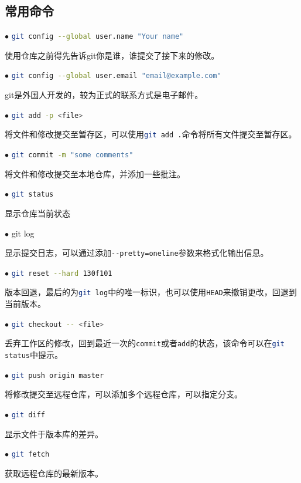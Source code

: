 		\subsection{常用命令}
			\par $\bullet$ \lstinline[language=sh]{git config --global user.name "Your name"}
			\par 使用仓库之前得先告诉git你是谁，谁提交了接下来的修改。
			\par $\bullet$ \lstinline[language=sh]{git config --global user.email "email@example.com"}
			\par git是外国人开发的，较为正式的联系方式是电子邮件。
			\par $\bullet$ \lstinline[language=sh]{git add -p <file>}
			\par 将文件和修改提交至暂存区，可以使用\lstinline[language=sh]{git add .}命令将所有文件提交至暂存区。
			\par $\bullet$ \lstinline[language=sh]{git commit -m "some comments"}
			\par 将文件和修改提交至本地仓库，并添加一些批注。
			\par $\bullet$ \lstinline[language=sh]{git status}
			\par 显示仓库当前状态			
			\par $\bullet$ \lstinline[language=sh]{}git log
			\par 显示提交日志，可以通过添加\lstinline[language=sh]{--pretty=oneline}参数来格式化输出信息。
			\par $\bullet$ \lstinline[language=sh]{git reset --hard 130f101}
			\par 版本回退，最后的为\lstinline[language=sh]{git log}中的唯一标识，也可以使用\lstinline[language=sh]{HEAD}来撤销更改，回退到当前版本。
			\par $\bullet$ \lstinline[language=sh]{git checkout -- <file>}
			\par 丢弃工作区的修改，回到最近一次的\lstinline[language=sh]{commit}或者\lstinline[language=sh]{add}的状态，该命令可以在\lstinline[language=sh]{git status}中提示。
			\par $\bullet$ \lstinline[language=sh]{git push origin master}
			\par 将修改提交至远程仓库，可以添加多个远程仓库，可以指定分支。
			\par $\bullet$ \lstinline[language=sh]{git diff}
			\par 显示文件于版本库的差异。
			\par $\bullet$ \lstinline[language=sh]{git fetch}
			\par 获取远程仓库的最新版本。

